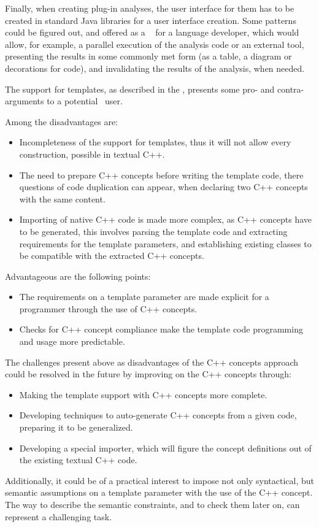 Finally, when creating plug-in analyses, the user interface for them has to be created in standard Java libraries for a user interface creation. Some patterns 
could be figured out, and offered as a \jbmps\  for a language developer, which would allow, for example, a parallel execution of the analysis code or an external tool,
presenting the results in some commonly met form (as a table, a diagram or decorations for code), and invalidating the results of the analysis, when needed.


The support for templates, as described in the , presents some pro- and contra- arguments to a potential \pcpp\ user. 

Among the disadvantages are:
\begin{itemize}
 \item Incompleteness of the support for templates, thus it will not allow every construction,
 possible in textual C++.
 \item The need to prepare C++ concepts before writing the template code, there questions of 
 code duplication can appear, when declaring two C++ concepts with the same content.
 \item Importing of native C++ code is made more complex, as C++ concepts have to be generated,
 this involves parsing the template code and extracting requirements for the template parameters,
 and establishing existing classes to be compatible with the extracted C++ concepts.
\end{itemize}


Advantageous are the following points:
\begin{itemize}
 \item The requirements on a template parameter are made explicit for a programmer through the 
 use of C++ concepts.
 \item Checks for C++ concept compliance make the template code programming and usage more
 predictable.
\end{itemize}

The challenges present above as disadvantages of the C++ concepts approach could be resolved
in the future by improving on the C++ concepts through:
\begin{itemize}
 \item Making the template support with C++ concepts more complete.
 \item Developing techniques to auto-generate C++ concepts from a given code, 
 preparing it to be generalized.
 \item Developing a special importer, which will figure the concept definitions out of
 the existing textual C++ code.
\end{itemize}

Additionally, it could be of a practical interest to impose not only syntactical, but semantic assumptions
on a template parameter with the use of the C++ concept. The way to describe the semantic constraints, and
to check them later on, can represent a challenging task.
